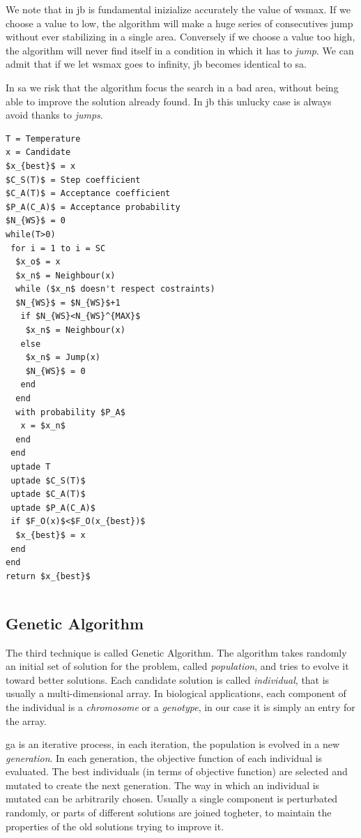 \documentclass[journal]{IEEEtran}
\begin{document}
We note that in \gls{jb} is fundamental inizialize accurately the value of \gls{wsmax}. If we choose a value to low, the algorithm will make a huge series of consecutives jump without ever stabilizing in a single area. Conversely if we choose a value too high, the algorithm will never find itself in a condition in which it has to \textit{jump}. We can admit that if we let \gls{wsmax} goes to infinity, \gls{jb} becomes identical to \gls{sa}.

In \gls{sa} we risk that the algorithm focus the search in a bad area, without being able to improve the solution already found. In \gls{jb} this unlucky case is always avoid thanks to \textit{jumps}.


\pagebreak

\begin{lstlisting}[mathescape=true,frame=single]
T = Temperature
x = Candidate
$x_{best}$ = x
$C_S(T)$ = Step coefficient
$C_A(T)$ = Acceptance coefficient
$P_A(C_A)$ = Acceptance probability
$N_{WS}$ = 0
while(T>0)
 for i = 1 to i = SC
  $x_o$ = x
  $x_n$ = Neighbour(x)
  while ($x_n$ doesn't respect costraints)
  $N_{WS}$ = $N_{WS}$+1
   if $N_{WS}<N_{WS}^{MAX}$
    $x_n$ = Neighbour(x)
   else
    $x_n$ = Jump(x)
    $N_{WS}$ = 0
   end
  end
  with probability $P_A$
   x = $x_n$
  end
 end
 uptade T
 uptade $C_S(T)$
 uptade $C_A(T)$
 uptade $P_A(C_A)$
 if $F_O(x)$<$F_O(x_{best})$
  $x_{best}$ = x
 end
end
return $x_{best}$
\end{lstlisting} 

\pagebreak

\begin{lstlisting}[frame=single]
\end{lstlisting} 


\subsection{Genetic Algorithm}
The third technique is called Genetic Algorithm.
The algorithm takes randomly an initial set of solution for the problem, called \textit{population}, and tries to evolve it toward better solutions.
Each candidate solution is called \textit{individual}, that is usually a multi-dimensional array. In biological applications, each component of the individual is a \textit{chromosome} or a \textit{genotype}, in our case it is simply an entry for the array.

\gls{ga} is an iterative process, in each iteration, the population is evolved in a new \textit{generation}.
In each generation, the objective function of each individual is evaluated. The best individuals (in terms of objective function) are selected and mutated to create the next generation.
The way in which an individual is mutated can be arbitrarily chosen.
Usually a single component is perturbated randomly, or parts of different solutions are joined togheter, to maintain the properties of the old solutions trying to improve it.
\end{document}
